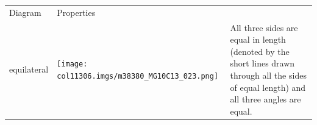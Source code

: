\begin{table}[H]
\begin{center}
\begin{xtabular*}{\mytablewidth}[t]{|p{10\mystarwidth}|p{10\mystarwidth}|p{10\mystarwidth}|}
        Diagram &
    
    
        Properties%
     \tabularnewline{}
    
    
        equilateral &
    
    
        
                  
    \setcounter{subfigure}{0}

\label{m38380*id317558}
    \begin{center}
    \label{m38380*id317558!!!underscore!!!media}\label{m38380*id317558!!!underscore!!!printimage}\texttt{[image: col11306.imgs/m38380\_MG10C13\_023.png]} %
        
      \vspace{2pt}
    \vspace{.1in}
    
    \end{center}



    \addtocounter{footnote}{-0}
    
                 &
    
    
        All three sides are equal in length (denoted by the short lines drawn through all the sides of equal length) and all three angles are equal.%
     \tabularnewline{}
    

\end{xtabular*}
\end{center}
\end{table}
